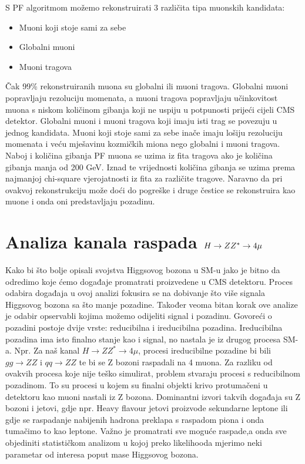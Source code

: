 \documentclass[12pt,a4paper,oneside]{article}
\begin{document}
\begin{linenumbers}
		S PF algoritmom možemo rekonstruirati 3 različita tipa muonskih kandidata:
		\begin{itemize}
			\item Muoni koji stoje sami za sebe
			\item Globalni muoni
			\item Muoni tragova 
		\end{itemize}
		Čak 99\% rekonstruiranih muona su globalni ili muoni tragova. Globalni muoni popravljaju rezoluciju momenata, a muoni tragova popravljaju učinkovitost muona s niskom količinom gibanja koji ne uspiju u potpunosti prijeći cijeli CMS detektor. Globalni muoni i muoni tragova koji imaju isti trag se povezuju u jednog kandidata. Muoni koji stoje sami za sebe inače imaju lošiju rezoluciju momenata i veću mješavinu kozmičkih miona nego globalni i muoni tragova.
		Naboj i količina gibanja PF muona se uzima iz fita tragova ako je količina gibanja manja od 200 GeV. Iznad te vrijednosti količina gibanja se uzima prema najmanjoj chi-square vjerojatnosti iz fita za različite tragove. Naravno da pri ovakvoj rekonstrukciju može doći do pogreške i druge čestice se rekonstruira kao muone i onda oni predstavljaju pozadinu.~\cite{doktorat}
		
		\newpage
		\section{Analiza kanala raspada \begin{math}
		\boldmath	{H \rightarrow ZZ^* \rightarrow 4\mu }\end{math} }
		Kako bi što bolje opisali svojstva Higgsovog bozona u SM-u jako je bitno da odredimo koje ćemo događaje promatrati proizvedene u CMS detektoru.
		Proces odabira događaja u ovoj analizi fokusira se na dobivanje što više signala Higgsovog bozona sa što manje pozadine. Također veoma bitan korak ove analize je odabir opservabli kojima možemo odijeliti signal i pozadinu. Govoreći o pozadini postoje dvije vrste: reducibilna i ireducibilna pozadina. 
		Ireducibilna pozadina ima isto finalno stanje kao i signal, no nastala je iz drugog procesa SM-a. Npr. Za naš kanal \begin{math}
		H \rightarrow ZZ^* \rightarrow 4\mu \end{math}, procesi ireducibilne pozadine bi bili \begin{math}
		gg \rightarrow ZZ
		\end{math} i \begin{math}
		qq \rightarrow ZZ
		\end{math} te bi se Z bozoni raspadali na 4 muona. Za razliku od ovakvih procesa koje nije teško simulirat, problem stvaraju procesi s reducibilnom pozadinom. To su procesi u kojem su finalni objekti krivo protumačeni u detektoru kao muoni nastali iz Z bozona. Dominantni izvori takvih događaja su Z bozoni i jetovi, gdje npr. Heavy flavour jetovi proizvode sekundarne leptone ili gdje se raspadanje nabijenih hadrona preklapa s raspadom piona i onda tumačimo to kao leptone. 
		Važno je promatrati sve moguće raspade,a onda sve objediniti statističkom analizom u kojoj preko likelihooda mjerimo neki parametar od interesa poput mase Higgsovog bozona.~\cite{doktorat}	
	

\end{linenumbers}
\end{document}
